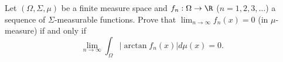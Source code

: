 Let $(\Omega,\Sigma,\mu)$ be a finite measure space and
$f_n:\Omega\rightarrow \R$ ($n=1,2,3,\ldots $) a sequence of
$\Sigma$-measurable functions. Prove that $\lim_{n\rightarrow
\infty}f_n(x)=0$ (in $\mu$-measure) if and only if
$$\lim_{n\rightarrow \infty}\int_{\Omega}|\arctan f_n(x)|d\mu(x)=0.$$
